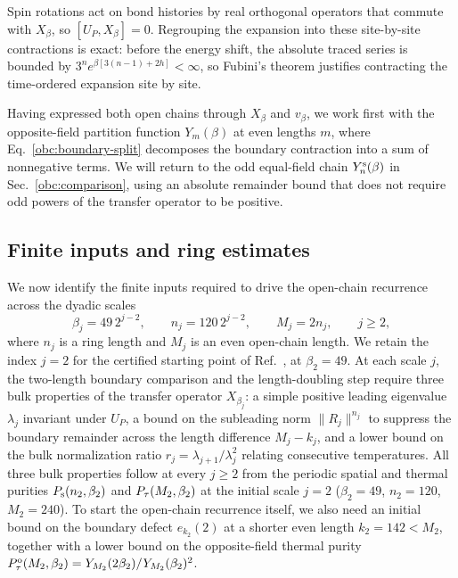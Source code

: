 Spin rotations act on bond histories by real orthogonal operators that commute
with $X_\beta$, so $[U_P,X_\beta]=0$. Regrouping the expansion into these site-by-site
contractions is exact: before the energy shift, the absolute traced series
is bounded by
$3^n e^{\beta[3(n-1)+2h]}<\infty$, so Fubini's theorem justifies
contracting the time-ordered expansion site by site.

Having expressed both open chains through $X_\beta$ and $v_\beta$, we work first with the opposite-field partition function $Y_m(\beta)$ at even lengths $m$, where
Eq.~\eqref{obc:boundary-split} decomposes the boundary contraction into a sum of nonnegative terms.
We will return to the odd equal-field chain $Y_n^{\mathrm{s}}(\beta)$ in Sec.~\ref{obc:comparison}, using an absolute remainder
bound that does not require odd powers of the transfer operator to be positive.

\subsection{Finite inputs and ring estimates}
\label{obc:ring}

We now identify the finite inputs required to drive the open-chain recurrence across the dyadic scales
\begin{equation}
 \beta_j=49\,2^{j-2},\qquad n_j=120\,2^{j-2},\qquad
 M_j=2n_j,\qquad j\ge2,
 \label{obc:scales}
\end{equation}
where $n_j$ is a ring length and $M_j$ is an even open-chain length.
We retain the index $j=2$ for the certified starting point of
Ref.~\cite{OpenAI2026Boundaryfield}, at $\beta_2=49$.
At each scale $j$, the two-length boundary comparison and the length-doubling step require three bulk properties of the transfer operator $X_{\beta_j}$: a simple positive leading eigenvalue $\lambda_j$ invariant under $U_P$, a bound on the subleading norm $\|R_j\|^{n_j}$ to suppress the boundary remainder across the length difference $M_j-k_j$, and a lower bound on the bulk normalization ratio $r_j=\lambda_{j+1}/\lambda_j^2$ relating consecutive temperatures. All three bulk properties follow at every $j\ge2$ from the periodic spatial and thermal purities $P_{\mathrm s}(n_2,\beta_2)$ and $P_{\tau}(M_2,\beta_2)$ at the initial scale $j=2$ ($\beta_2=49$, $n_2=120$, $M_2=240$). To start the open-chain recurrence itself, we also need an initial bound on the boundary defect $e_{k_2}(2)$ at a shorter even length $k_2=142<M_2$, together with a lower bound on the opposite-field thermal purity $P_{\tau}^{\mathrm{o}}(M_2,\beta_2)=Y_{M_2}(2\beta_2)/Y_{M_2}(\beta_2)^2$.

